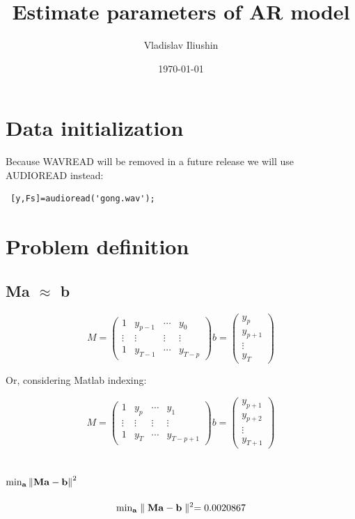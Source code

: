 \documentclass[a4paper]{article}
\title{Estimate parameters of AR model}
\author{Vladislav Iliushin}
\date{\today}
\begin{document}
\maketitle

 

\section{Data initialization}
Because  WAVREAD will be removed in a future release we will use AUDIOREAD instead:
\begin{verbatim} [y,Fs]=audioread('gong.wav');
 \end{verbatim}

\section{Problem definition}
\subsection{Ma $\approx{}$ b}



\[ \left. M =\begin{pmatrix}
 1 & y_{p-1}&  \cdots& y_{0} \\ 
 \vdots  &  \vdots&   \vdots & \vdots \\ 
 1 &  y_{T-1} & \cdots & y_{T-p}
\end{pmatrix} \right.
%
\left. b =\begin{pmatrix}
y_{p}\\ 
y_{p+1}\\
\vdots \\ 
y_{T}
\end{pmatrix} \right.
\]

Or, considering Matlab indexing:

\[ \left. M =\begin{pmatrix}
 1 & y_{p}&  \cdots& y_{1} \\ 
 \vdots  &  \vdots&   \vdots & \vdots \\ 
 1 &  y_{T} & \cdots & y_{T-p+1}
\end{pmatrix} \right.
%
\left. b =\begin{pmatrix}
y_{p+1}\\ 
y_{p+2}\\
\vdots \\ 
y_{T+1}
\end{pmatrix} \right.
\]


\subsection{ $\textup{min}_{\mathbf{a}} \left \| \mathbf{ Ma-b }\right \|^{2} $}
\[\textup{min}_{\mathbf{a}} \parallel\mathbf{ Ma-b }\parallel^{2} = 0.0020867\]
\end{document}
